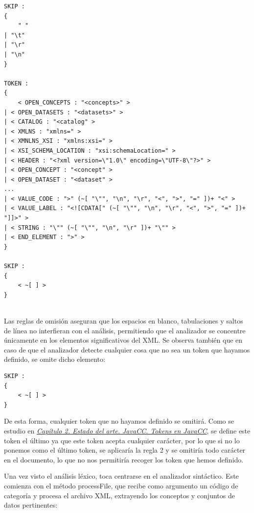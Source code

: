 \lstset{inputencoding=utf8/latin1}
\begin{lstlisting}
SKIP :
{
    " "
| "\t"
| "\r"
| "\n"
}

TOKEN :
{
    < OPEN_CONCEPTS : "<concepts>" >
| < OPEN_DATASETS : "<datasets>" >
| < CATALOG : "<catalog" >
| < XMLNS : "xmlns=" >
| < XMNLNS_XSI : "xmlns:xsi=" >
| < XSI_SCHEMA_LOCATION : "xsi:schemaLocation=" >
| < HEADER : "<?xml version=\"1.0\" encoding=\"UTF-8\"?>" >
| < OPEN_CONCEPT : "<concept" >
| < OPEN_DATASET : "<dataset" >
...
| < VALUE_CODE : ">" (~[ "\"", "\n", "\r", "<", ">", "=" ])+ "<" >
| < VALUE_LABEL : "<![CDATA[" (~[ "\"", "\n", "\r", "<", ">", "=" ])+ "]]>" >
| < STRING : "\"" (~[ "\"", "\n", "\r" ])+ "\"" >
| < END_ELEMENT : ">" >
}

SKIP :
{
    < ~[ ] >
}
    
\end{lstlisting}

Las reglas de omisión aseguran que los espacios en blanco, tabulaciones y saltos de línea no interfieran con el análisis, permitiendo que el analizador se concentre únicamente en los elementos significativos del XML. Se observa también que en caso de que el analizador detecte cualquier cosa que no sea un token que hayamos definido, se omite dicho elemento:

\lstset{inputencoding=utf8/latin1}
\begin{lstlisting}
SKIP :
{
    < ~[ ] >
}
\end{lstlisting}

De esta forma, cualquier token que no hayamos definido se omitirá. Como se estudio en \hyperref[sec:tokensenjavacc]{\textit{Capítulo 2. Estado del arte. JavaCC. Tokens en JavaCC}}, se define este token el último ya que este token acepta cualquier carácter, por lo que si no lo ponemos como el último token, se aplicaría la regla 2 y se omitiría todo carácter en el documento, lo que no nos permitiría recoger los token que hemos definido.


Una vez visto el análisis léxico, toca centrarse en el analizador sintáctico. Este comienza con el método processFile, que recibe como argumento un código de categoría y procesa el archivo XML, extrayendo los conceptos y conjuntos de datos pertinentes:

